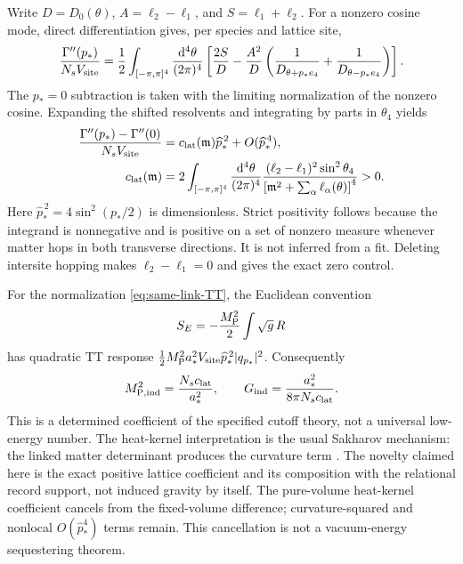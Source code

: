 Write \(D=D_0(\theta)\), \(A=\ell_2-\ell_1\), and
\(S=\ell_1+\ell_2\).  For a nonzero cosine mode, direct
differentiation gives, per species and lattice site,
\begin{equation}
 \frac{\Gamma''(p_*)}{N_sV_{\rm site}}
 =\frac12\int_{[-\pi,\pi]^4}\frac{\mathrm d^4\theta}{(2\pi)^4}
 \left[
 \frac{2S}{D}
 -\frac{A^2}{D}
 \left(\frac1{D_{\theta+p_*e_4}}+\frac1{D_{\theta-p_*e_4}}\right)
 \right].
 \label{eq:same-link-exact-kernel}
\end{equation}
The \(p_*=0\) subtraction is taken with the limiting normalization of the
nonzero cosine.  Expanding the shifted resolvents and integrating by parts
in \(\theta_4\) yields
\begin{align}
 \frac{\Gamma''(p_*)-\Gamma''(0)}{N_sV_{\rm site}}
 &=c_{\rm lat}(\mathfrak m)\widehat p_*^{\,2}
   +O(\widehat p_*^{\,4}),\nonumber\\
 c_{\rm lat}(\mathfrak m)
 &=2\int_{[-\pi,\pi]^4}\frac{\mathrm d^4\theta}{(2\pi)^4}
 \frac{(\ell_2-\ell_1)^2\sin^2\theta_4}
 {\left[\mathfrak m^2+\sum_\alpha\ell_\alpha(\theta)\right]^4}>0 .
 \label{eq:same-link-positive-c}
\end{align}
Here \(\widehat p_*^{\,2}=4\sin^2(p_*/2)\) is dimensionless.
Strict positivity follows because the integrand is nonnegative and is
positive on a set of nonzero measure whenever matter hops in both transverse
directions.  It is not inferred from a fit.  Deleting intersite hopping makes
\(\ell_2-\ell_1=0\) and gives the exact zero control.

For the normalization \eqref{eq:same-link-TT}, the Euclidean convention
\begin{equation}
 S_E=-\frac{M_{\rm P}^2}{2}\int\sqrt g\,R
\end{equation}
has quadratic TT response
\(\tfrac12M_{\rm P}^2a_*^2V_{\rm site}
\widehat p_*^{\,2}|q_{p_*}|^2\).
Consequently
\begin{equation}
 M_{\rm P,ind}^2=\frac{N_sc_{\rm lat}}{a_*^2},
 \qquad
 G_{\rm ind}=\frac{a_*^2}{8\pi N_sc_{\rm lat}} .
 \label{eq:same-link-newton}
\end{equation}
This is a determined coefficient of the specified cutoff theory, not a
universal low-energy number.  The heat-kernel interpretation is the usual
Sakharov mechanism: the linked matter determinant produces the curvature
term \cite{Sakharov1968,Adler1982,Visser2002,Vassilevich2003}.  The novelty
claimed here is the exact positive lattice coefficient and its composition
with the relational record support, not induced gravity by itself.
The pure-volume heat-kernel coefficient cancels from the fixed-volume
difference; curvature-squared and nonlocal \(O(\widehat p_*^4)\) terms remain.
This cancellation is not a vacuum-energy sequestering theorem.

